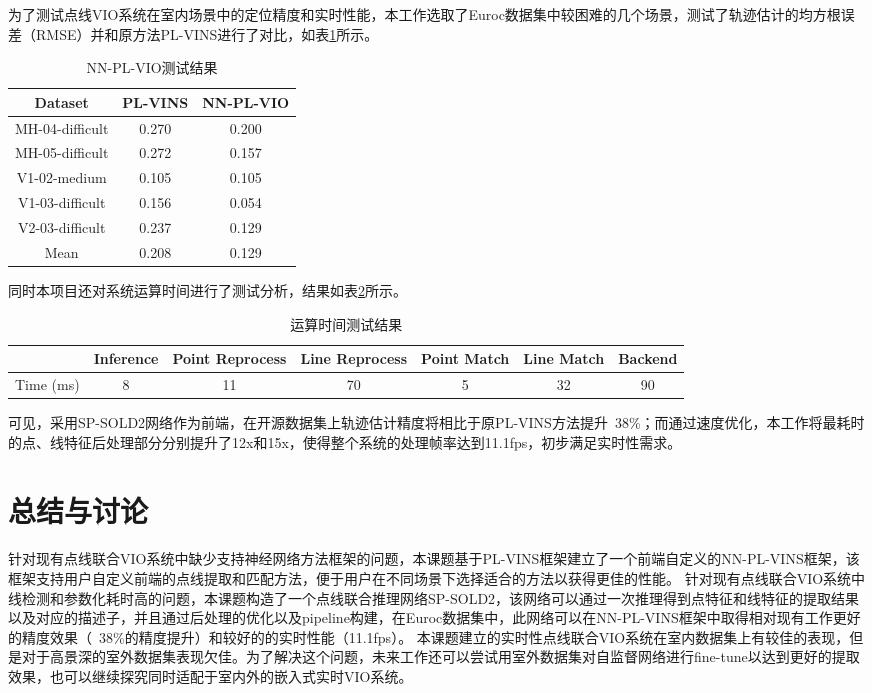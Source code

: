 为了测试点线VIO系统在室内场景中的定位精度和实时性能，本工作选取了Euroc数据集中较困难的几个场景，测试了轨迹估计的均方根误差（RMSE）并和原方法PL-VINS进行了对比，如表\ref{tab_euroc_res}所示。
\begin{table}[!ht]
  \centering
  \begin{tabular}{|c|c|c|}
  \hline
      Dataset & PL-VINS & NN-PL-VIO \\ \hline
      MH-04-difficult & 0.270 & 0.200 \\ \hline
      MH-05-difficult & 0.272 & 0.157 \\ \hline
      V1-02-medium & 0.105 & 0.105 \\ \hline
      V1-03-difficult & 0.156 & 0.054 \\ \hline
      V2-03-difficult & 0.237 & 0.129 \\ \hline
      Mean & 0.208 & 0.129 \\ \hline
  \end{tabular}
  \caption{NN-PL-VIO测试结果}
  \label{tab_euroc_res}
\end{table}

同时本项目还对系统运算时间进行了测试分析，结果如表\ref{tab_inf_time}所示。
\begin{table}[!ht]
  \centering
  \begin{tabular}{|c|c|c|c|c|c|c|}
  \hline
      ~ & Inference & Point Reprocess & Line Reprocess & Point Match & Line Match & Backend \\ \hline
      Time (ms) & 8 & 11 & 70 & 5 & 32 & 90 \\ \hline
  \end{tabular}
  \caption{运算时间测试结果}
  \label{tab_inf_time}
\end{table}

可见，采用SP-SOLD2网络作为前端，在开源数据集上轨迹估计精度将相比于原PL-VINS方法提升~38\%；而通过速度优化，本工作将最耗时的点、线特征后处理部分分别提升了12x和15x，使得整个系统的处理帧率达到11.1fps，初步满足实时性需求。

\section{总结与讨论}
针对现有点线联合VIO系统中缺少支持神经网络方法框架的问题，本课题基于PL-VINS框架建立了一个前端自定义的NN-PL-VINS框架，该框架支持用户自定义前端的点线提取和匹配方法，便于用户在不同场景下选择适合的方法以获得更佳的性能。
针对现有点线联合VIO系统中线检测和参数化耗时高的问题，本课题构造了一个点线联合推理网络SP-SOLD2，该网络可以通过一次推理得到点特征和线特征的提取结果以及对应的描述子，并且通过后处理的优化以及pipeline构建，在Euroc数据集中，此网络可以在NN-PL-VINS框架中取得相对现有工作更好的精度效果（~38\%的精度提升）和较好的的实时性能（11.1fps）。
本课题建立的实时性点线联合VIO系统在室内数据集上有较佳的表现，但是对于高景深的室外数据集表现欠佳。为了解决这个问题，未来工作还可以尝试用室外数据集对自监督网络进行fine-tune以达到更好的提取效果，也可以继续探究同时适配于室内外的嵌入式实时VIO系统。
